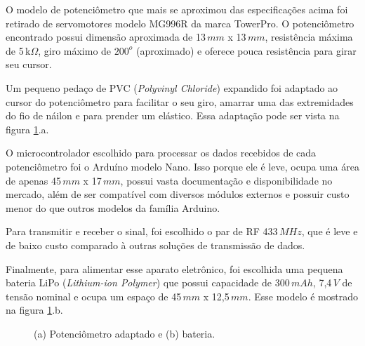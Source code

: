 \documentclass[
	12pt,				%
	openright,			%
	oneside,			%
	a4paper,			%
	english,			%
	brazil				%
	]{abntex2}
\begin{document}
			O modelo de potenciômetro que mais se aproximou das especificações acima foi retirado de servomotores modelo MG996R da marca TowerPro. O potenciômetro encontrado possui dimensão aproximada de 13$\,mm$ x 13$\,mm$, resistência máxima de 5$\,$k$\Omega$, giro máximo de $200^{o}$ (aproximado) e oferece pouca resistência para girar seu cursor. 

			Um pequeno pedaço de PVC (\textit{Polyvinyl Chloride}) expandido foi adaptado ao cursor do potenciômetro para facilitar o seu giro, amarrar uma das extremidades do fio de náilon e para prender um elástico. Essa adaptação pode ser vista na figura \ref{Fig:potentiometer-and-battery}.a.

			O microcontrolador escolhido para processar os dados recebidos de cada potenciômetro foi o Arduíno modelo Nano. Isso porque ele é leve, ocupa uma área de apenas 45$\,mm$ x 17$\,mm$, possui vasta documentação e disponibilidade no mercado, além de ser compatível com diversos módulos externos e possuir custo menor do que outros modelos da família Arduino.

			Para transmitir e receber o sinal, foi escolhido o par de RF 433$\,MHz$, que é leve e de baixo custo comparado à outras soluções de transmissão de dados.

			Finalmente, para alimentar esse aparato eletrônico, foi escolhida uma pequena bateria LiPo (\textit{Lithium-ion Polymer}) que possui capacidade de 300$\,mAh$, 7,4$\,V$ de tensão nominal e ocupa um espaço de 45$\,mm$ x 12,5$\,mm$. Esse modelo é mostrado na figura \ref{Fig:potentiometer-and-battery}.b.


	\begin{figure}[!htb]
		 \centering
		 \caption{ (a) Potenciômetro adaptado e (b) bateria.}
		 \centering
		 \label{Fig:potentiometer-and-battery}
	 \end{figure}
\end{document}
